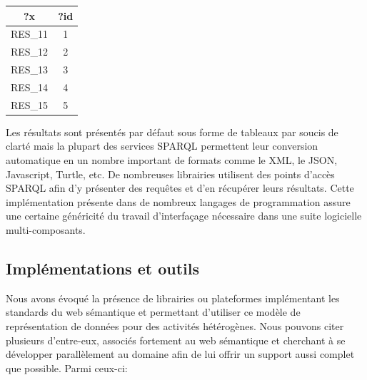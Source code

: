\begin{center}
 \begin{tabular}{|c | c|} 
 \hline
 ?x & ?id \\ [0.5ex] 
 \hline
 RES\_11 & 1 \\ 
 RES\_12 & 2 \\
 RES\_13 & 3 \\
 RES\_14 & 4 \\
 RES\_15 & 5 \\
 \hline
\end{tabular}
\end{center}

Les résultats sont présentés par défaut sous forme de tableaux par soucis de clarté mais la plupart des services SPARQL permettent leur conversion automatique en un nombre important de formats comme le XML, le JSON, Javascript, Turtle, etc.
De nombreuses librairies utilisent des points d'accès SPARQL afin d'y présenter des requêtes et d'en récupérer leurs résultats. Cette implémentation présente dans de nombreux langages de programmation assure une certaine généricité du travail d'interfaçage nécessaire dans une suite logicielle multi-composants.

\subsection{Implémentations et outils} \label{web_semantic_tools}

Nous avons évoqué la présence de librairies ou plateformes implémentant les standards du web sémantique et permettant d'utiliser ce modèle de représentation de données pour des activités hétérogènes. Nous pouvons citer plusieurs d'entre-eux, associés fortement au web sémantique et cherchant à se développer parallèlement au domaine afin de lui offrir un support aussi complet que possible. Parmi ceux-ci:

